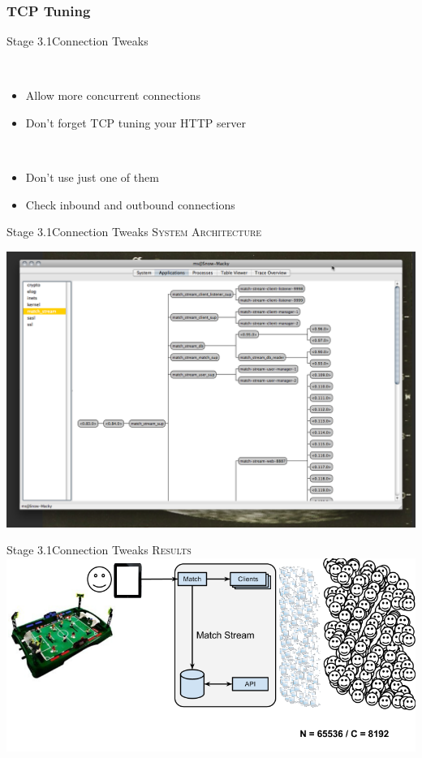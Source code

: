 \documentclass[utf8]{beamer}
\begin{document}
\subsubsection{TCP Tuning}
\begin{frame}{Stage 3.1}{Connection Tweaks}
	\begin{description}
		\item<+->[Backlog]\ \\
			\begin{itemize}
				\item Allow more concurrent connections
				\item Don't forget TCP tuning your HTTP server
			\end{itemize}
		\item<+->[Connections]\ \\
			\begin{itemize}
				\item Don't use just one of them
				\item Check inbound and outbound connections
			\end{itemize}
	\end{description}
\end{frame}
\begin{frame}{Stage 3.1}{Connection Tweaks}
	\textsc{System Architecture}
	\begin{center}
		\includegraphics[height=.75\textheight]{img/running-late.png}
	\end{center}
\end{frame}
\begin{frame}{Stage 3.1}{Connection Tweaks}
	\textsc{Results}
	\includegraphics[top=-1,width=\textwidth]{img/MatchStream-3.png}
\end{frame}
\end{document}
